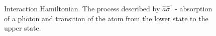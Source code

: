 \begin{figure}
\centering



\caption{Interaction Hamiltonian. The process described by $\hat{a}\hat{\sigma}^{\dag}$ - absorption of
  a photon and transition of the atom from the lower state to the upper state.}
\label{figPart1Ch2_2_2}
\end{figure}